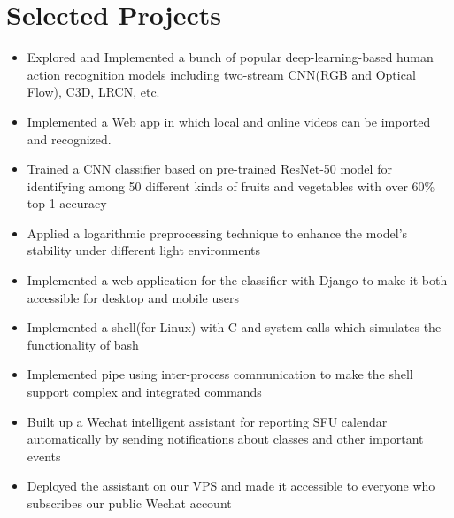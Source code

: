 \documentclass[12pt,a4paper,sans]{moderncv}   %
\begin{document}
\section{Selected Projects}

{%
\begin{itemize}%
\item Explored and Implemented a bunch of popular deep-learning-based human action recognition models including two-stream CNN(RGB and Optical Flow), C3D, LRCN, etc.
%
\item Implemented a Web app in which local and online videos can be imported and recognized.
\end{itemize}
}

{%
\begin{itemize}%
\item Trained a CNN classifier based on pre-trained ResNet-50 model for identifying among 50 different kinds of fruits and vegetables with over 60\% top-1 accuracy%
\item Applied a logarithmic preprocessing technique to enhance the model's stability under different light environments
\item Implemented a web application for the classifier with Django to make it both accessible for desktop and mobile users
\end{itemize}
}

{%
\begin{itemize}%
\item Implemented a shell(for Linux) with C and system calls which simulates the functionality of bash%
\item Implemented pipe using inter-process communication to make the shell support complex and integrated commands
\end{itemize}
}


{%
\begin{itemize}%
\item Built up a Wechat intelligent assistant for reporting SFU calendar automatically by sending notifications about classes and other important events%
\item Deployed the assistant on our VPS and made it accessible to everyone who subscribes our public Wechat account
\end{itemize}
}
\end{document}
